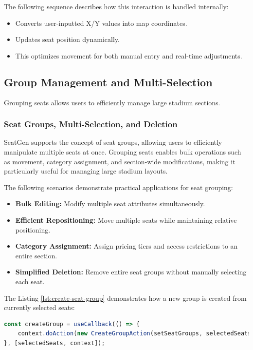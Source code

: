 The following sequence describes how this interaction is handled internally:
\begin{itemize}
    \item Converts user-inputted X/Y values into map coordinates.
    \item Updates seat position dynamically.
    \item This optimizes movement for both manual entry and real-time adjustments.
\end{itemize}

\subsection{Group Management and Multi-Selection}
Grouping seats allows users to efficiently manage large stadium sections.
\subsubsection{Seat Groups, Multi-Selection, and Deletion}

SeatGen supports the concept of seat groups, allowing users to efficiently manipulate multiple seats at once. Grouping seats enables bulk operations such as movement, category assignment, and section-wide modifications, making it particularly useful for managing large stadium layouts.

The following scenarios demonstrate practical applications for seat grouping:
\begin{itemize}
    \item \textbf{Bulk Editing:} Modify multiple seat attributes simultaneously.
    \item \textbf{Efficient Repositioning:} Move multiple seats while maintaining relative positioning.
    \item \textbf{Category Assignment:} Assign pricing tiers and access restrictions to an entire section.
    \item \textbf{Simplified Deletion:} Remove entire seat groups without manually selecting each seat.
\end{itemize}

The Listing \ref{lst:create-seat-group} demonstrates how a new group is created from currently selected seats:
\begin{lstlisting}[language=TypeScript, caption=Creating Seat Groups, label=lst:create-seat-group]
const createGroup = useCallback(() => {
    context.doAction(new CreateGroupAction(setSeatGroups, selectedSeats));
}, [selectedSeats, context]);
\end{lstlisting}

